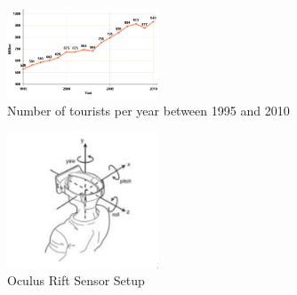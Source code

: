 \begin{figure}[t]
    \centering
    \includegraphics[width=0.40\textwidth]{img/worldTouristsPerYear}
    \caption[Number of tourists per year between 1995 and 2010]{Number of tourists per year between 1995 and 2010\footnotemark}
    \label{fig:touristsPerYear}
\end{figure}

\begin{figure}[t]
    \centering
    \includegraphics[width=0.40\textwidth]{img/OculusRiftSensorSetup}
    \caption[Oculus Rift Sensor Setup]{Oculus Rift Sensor Setup}
    \label{fig:OculusRiftSensorSetup}
\end{figure}




